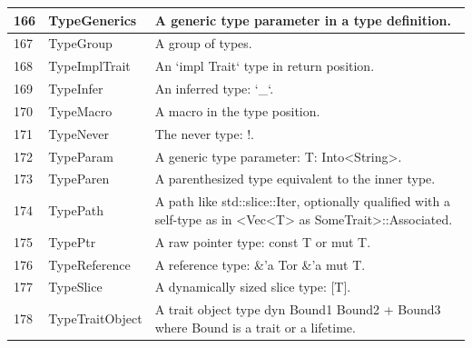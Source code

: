 \begin{longtable}{| p{} | p{} | p{} |}
166   & TypeGenerics                   & A generic type parameter in a type definition.                                                                 \\ \hline
167   & TypeGroup                      & A group of types.                                                                                              \\ \hline
168   & TypeImplTrait                  & An `impl Trait` type in return position.                                                                       \\ \hline
169   & TypeInfer                      & An inferred type: `\_`.                                                                                         \\ \hline
170   & TypeMacro                      & A macro in the type position.                                                                                  \\ \hline
171   & TypeNever                      & The never type: !.                                                                                             \\ \hline
172   & TypeParam                      & A generic type parameter: T: Into<String>.                                                                     \\ \hline
173   & TypeParen                      & A parenthesized type equivalent to the inner type.                                                             \\ \hline
174   & TypePath                       & A path like std::slice::Iter, optionally qualified with a self-type as in <Vec<T> as SomeTrait>::Associated.   \\ \hline
175   & TypePtr                        & A raw pointer type: const T or \*mut T.                                                                        \\ \hline
176   & TypeReference                  & A reference type: \&'a Tor \&'a mut T.                                                                           \\ \hline
177   & TypeSlice                      & A dynamically sized slice type: [T].                                                                           \\ \hline
178   & TypeTraitObject                & A trait object type dyn Bound1 Bound2 + Bound3 where Bound is a trait or a lifetime.                           \\ \hline

\end{longtable}
